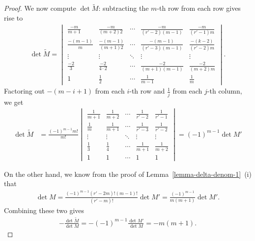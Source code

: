 \documentclass[11pt]{amsart}
\theoremstyle{definition}
\numberwithin{equation}{subsection}
\theoremstyle{plain}
\theoremstyle{plain}
\theoremstyle{plain}
\theoremstyle{plain}
\theoremstyle{plain}
\theoremstyle{plain}
\theoremstyle{plain}
\theoremstyle{plain}
\theoremstyle{plain}
\theoremstyle{plain}
\theoremstyle{plain}
\theoremstyle{plain}
\theoremstyle{definition}
\theoremstyle{definition}
\theoremstyle{definition}
\theoremstyle{remark}
\renewcommand{\(}{\textup{(}}
\renewcommand{\)}{\textup{)}}
\begin{document}
\begin{proof}
We now compute $\det \tilde M$: subtracting the $m$-th row from each row gives rise to
    \begin{align*}
       \det\tilde M= \begin{vmatrix}
          \frac{-m}{m+1} & \frac{-m}{(m+2)2} & \cdots
           & \frac{-m}{(r'-2)(m-1)} & \frac{-m}{(r'-1)m} \\
          \frac{-(m-1)}{m} & \frac{-(m-1)}{(m+1)2} & \cdots
           & \frac{-(m-1)}{(r'-3)(m-1)} & \frac{-(k-2)}{(r'-2)m} \\
          \vdots & \vdots & \ddots & \vdots & \vdots \\
          \frac{-2}{3} & \frac{-2}{4\cdot 2} & \cdots
           & \frac{-2}{(m+1)(m-1)} & \frac{-2}{(m+2)m} \\
          1 & \frac{1}{2} & \cdots & \frac{1}{m-1} & \frac{1}{m}
        \end{vmatrix}.
    \end{align*}
Factoring out $-(m-i+1)$ from each $i$-th row and $\frac{1}{j}$ from each $j$-th column, we get
    \begin{align*}
    \det \tilde M
        &=
        \frac{(-1)^{m-1} m!}{m!}
        \begin{vmatrix}
          \frac{1}{m+1} & \frac{1}{m+2} & \cdots & \frac{1}{r'-2} & \frac{1}{r'-1} \\
          \frac{1}{m} & \frac{1}{m+1} & \cdots & \frac{1}{r'-3} & \frac{1}{r'-2} \\
          \vdots & \vdots & \ddots & \vdots & \vdots \\
          \frac{1}{3} & \frac{1}{4} & \cdots & \frac{1}{m+1} & \frac{1}{m+2} \\
          1 & 1 & \cdots & 1 & 1
        \end{vmatrix}
        =
        (-1)^{m-1}\det M'
    \end{align*}

    On the other hand, we know from the proof of Lemma~\ref{lemma-delta-denom-1}~(i) that
    \begin{align*}
        \det M
        =\frac{(-1)^{m-1}(r'-2m)!(m-1)!}{(r'-m)!}\det M'
        =\frac{(-1)^{m-1}}{m(m+1)}\det M'.
    \end{align*}
Combining these two gives
    \begin{align*}
        -\frac{\det\tilde M}{\det M}
        =-(-1)^{m-1}\frac{\det M'}{\det M}
        =-m(m+1).
    \end{align*}



\end{proof}
\end{document}
